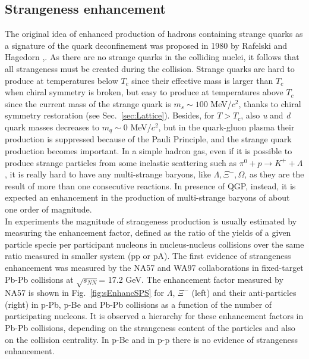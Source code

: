 \subsection{Strangeness enhancement}
\label{subsec:StrangEnhancSPS}
The original idea of enhanced production of hadrons containing strange quarks as a signature of the quark deconfinement was proposed in 1980 by Rafelski and Hagedorn \cite{PhysRevLett.48.1066},\cite{Muller:2011tu}. As there are no strange quarks in the colliding nuclei, it follows that all strangeness must be created during the collision. Strange quarks are hard to produce at temperatures below $T_c$ since their effective mass is larger than $T_c$ when chiral symmetry is broken, but easy to produce at temperatures above $T_c$ since the current mass of the strange quark is $m_s \sim 100$ MeV/$c^2$, thanks to chiral symmetry restoration (see Sec.~\ref{sec:Lattice}). Besides, for $T > T_c$, also \textit{u} and \textit{d} quark masses decreases to $m_q \sim 0$ MeV/$c^2$, but in the quark-gluon plasma their production is suppressed because of the Pauli Principle, and the strange quark production becomes important. In a simple hadron gas, even if it is possible to produce strange particles from some inelastic scattering such as $\pi^0+p \rightarrow K^++\Lambda$, it is really hard to have any multi-strange baryons, like $\Lambda , \Xi ^-,\Omega$, as they are the result of more than one consecutive reactions. In presence of QGP, instead, it is expected an enhancement in the production of multi-strange baryons of about one order of magnitude. \\In experiments the magnitude of strangeness production is usually estimated by measuring the enhancement factor, defined as the ratio of the yields of a given particle specie per participant nucleons in nucleus-nucleus collisions over the same ratio measured in smaller system (pp or pA). The first evidence of strangeness enhancement was measured by the NA57 and WA97 collaborations \cite{Sandor:2004bg} in fixed-target Pb-Pb collisions at $\sqrt{s_{NN}}$= 17.2 GeV. The enhancement factor measured by NA57 is shown in Fig.~\ref{fig:sEnhancSPS} for $\Lambda$, $\Xi^-$ (left) and their anti-particles (right) in p-Pb, p-Be and Pb-Pb collisions as a function of the number of participating nucleons. It is observed a hierarchy for these enhancement factors in Pb-Pb collisions, depending on the strangeness content of the particles and also on the collision centrality. In p-Be and in p-p there is no evidence of strangeness enhancement. 

